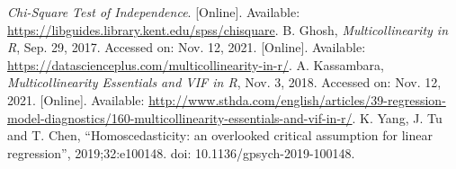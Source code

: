 \documentclass[a4paper]{article}
\begin{document}
\begin{thebibliography}{9}
     \emph{Chi-Square Test of Independence}. [Online]. Available: \url{https://libguides.library.kent.edu/spss/chisquare}. %
     B. Ghosh, \emph{Multicollinearity in R}, Sep. 29, 2017. Accessed on: Nov. 12, 2021. [Online]. Available: \href{https://datascienceplus.com/multicollinearity-in-r/}{https://datascienceplus.com/multicollinearity-in-r/}.
     A. Kassambara, \emph{Multicollinearity Essentials and VIF in R}, Nov. 3, 2018. Accessed on: Nov. 12, 2021. [Online]. Available: \href{http://www.sthda.com/english/articles/39-regression-model-diagnostics/160-multicollinearity-essentials-and-vif-in-r/}{http://www.sthda.com/english/articles/39-regression-model-diagnostics/160-multicollinearity-essentials-and-vif-in-r/}.
     K. Yang, J. Tu and T. Chen,  “Homoscedasticity: an overlooked critical assumption for linear regression”, 2019;32:e100148. doi: 10.1136/gpsych-2019-100148.




\end{thebibliography}































\author{phat.tran.k19}
\end{document}

